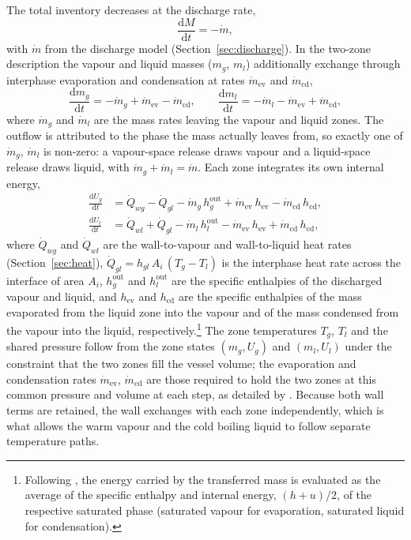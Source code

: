 \documentclass[5p,authoryear]{elsarticle}
\begin{document}
The total inventory decreases at the discharge rate,
\begin{equation}
\label{eq:massbal}
\frac{\mathrm{d}M}{\mathrm{d}t} = -\dot m,
\end{equation}
with $\dot m$ from the discharge model (Section~\ref{sec:discharge}). In the two-zone description
the vapour and liquid masses ($m_g$, $m_l$) additionally exchange through interphase evaporation
and condensation at rates $\dot m_\text{ev}$ and $\dot m_\text{cd}$,
\begin{equation}
\label{eq:zonemass}
\frac{\mathrm{d}m_g}{\mathrm{d}t} = -\dot m_g + \dot m_\text{ev} - \dot m_\text{cd},
\qquad
\frac{\mathrm{d}m_l}{\mathrm{d}t} = -\dot m_l - \dot m_\text{ev} + \dot m_\text{cd},
\end{equation}
where $\dot m_g$ and $\dot m_l$ are the mass rates leaving the vapour and liquid zones. The outflow
is attributed to the phase the mass actually leaves from, so exactly one of $\dot m_g$, $\dot m_l$
is non-zero: a vapour-space release draws vapour and a liquid-space release draws liquid, with
$\dot m_g + \dot m_l = \dot m$. Each zone integrates its own internal energy,
\begin{align}
\label{eq:zoneenergy}
\frac{\mathrm{d}U_g}{\mathrm{d}t} &= \dot Q_{wg} - \dot Q_{gl}
      - \dot m_g\,h_g^\text{out} + \dot m_\text{ev}\,h_\text{ev} - \dot m_\text{cd}\,h_\text{cd}, \\
\frac{\mathrm{d}U_l}{\mathrm{d}t} &= \dot Q_{wl} + \dot Q_{gl}
      - \dot m_l\,h_l^\text{out} - \dot m_\text{ev}\,h_\text{ev} + \dot m_\text{cd}\,h_\text{cd},
\nonumber
\end{align}
where $\dot Q_{wg}$ and $\dot Q_{wl}$ are the wall-to-vapour and wall-to-liquid heat rates
(Section~\ref{sec:heat}), $\dot Q_{gl} = h_{gl}\,A_i\,(T_g - T_l)$ is the interphase heat rate
across the interface of area $A_i$, $h_g^\text{out}$ and $h_l^\text{out}$ are the specific
enthalpies of the discharged vapour and liquid, and $h_\text{ev}$ and $h_\text{cd}$ are the specific
enthalpies of the mass evaporated from the liquid zone into the vapour and of the mass condensed from
the vapour into the liquid, respectively.\footnote{Following \citet{AndreasenStegelmann2026}, the
energy carried by the transferred mass is evaluated as the average of the specific enthalpy and
internal energy, $(h+u)/2$, of the respective saturated phase (saturated vapour for evaporation,
saturated liquid for condensation).} The zone temperatures $T_g$, $T_l$ and the shared pressure
follow from the zone states $(m_g, U_g)$ and $(m_l, U_l)$ under the constraint that the two zones fill
the vessel volume; the evaporation and condensation rates $\dot m_\text{ev}$, $\dot m_\text{cd}$ are
those required to hold the two zones at this common pressure and volume at each step, as detailed by
\citet{AndreasenStegelmann2026}. Because both wall
terms are retained, the wall exchanges with each zone independently, which is what allows the warm
vapour and the cold boiling liquid to follow separate temperature paths.
\end{document}
